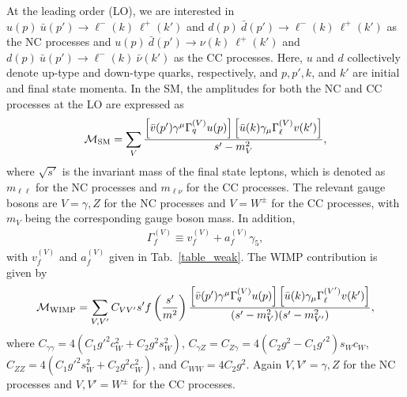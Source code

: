 \documentclass[12pt,twoside,book]{article}
\begin{document}
At the leading order (LO), we are interested in $u(p)~\bar{u}(p') \to \ell^{-}(k)~\ell^{+}(k')$ and $d(p)~\bar{d}(p') \to \ell^{-}(k)~\ell^{+}(k')$ as the NC processes and $u(p)~\bar{d}(p') \to \nu(k)~\ell^{+}(k')$ and $d(p)~\bar{u}(p') \to \ell^{-}(k)~\bar{\nu}(k')$ as the CC processes.
Here, $u$ and $d$ collectively denote up-type and down-type quarks, respectively, and $p, p', k$, and $k'$ are initial and final state momenta.
In the SM, the amplitudes for both the NC and CC processes at the LO are expressed as
\begin{align}
 \mathcal{M}_{\rm SM} = \sum_{V} \frac{\left[ \bar{v}(p')
 \gamma^\mu \Gamma_q^{(V)} u(p) \right] \left[ \bar{u}(k) \gamma_\mu
 \Gamma_{\ell}^{(V)} v(k') \right]}{s' - m_V^2},\label{eq_m_sm}
\end{align}
where $\sqrt{s'}$ is the invariant mass of the final state leptons, which is denoted as $m_{\ell\ell}$ for the NC processes and $m_{\ell\nu}$ for the CC processes.
The relevant gauge bosons are $V = \gamma, Z$ for the NC processes and $V = W^\pm$ for the CC processes, with $m_V$ being the corresponding gauge boson mass.
In addition,
\begin{align}
  \Gamma_f^{(V)} \equiv v_f^{(V)} + a_f^{(V)} \gamma_5,
\end{align}
with $v_f^{(V)}$ and $a_f^{(V)}$ given in Tab.~\ref{table_weak}.
The WIMP contribution is given by
\begin{align}
 \mathcal{M}_{\rm WIMP} = \sum_{V,V'} C_{VV'} s' f\left(\frac{s'}{m^2}\right)
 \frac{\left[ \bar{v}(p') \gamma^\mu \Gamma_q^{(V)} u(p) \right]
 \left[ \bar{u}(k) \gamma_\mu \Gamma_\ell^{(V')} v(k') \right]}
 {(s'-m_V^2)(s'-m_{V'}^2)},\label{eq_m_WIMP}
\end{align}
where $C_{\gamma \gamma} = 4(C_1 g'^2 c_W^2 + C_2 g^2 s_W^2)$, $C_{\gamma Z} = C_{Z \gamma} = 4(C_2 g^2 - C_1 g'^2) s_W c_W$, $C_{Z Z} = 4(C_1 g'^2 s_W^2 + C_2 g^2 c_W^2)$, and $C_{WW} = 4 C_2 g^2$.
Again $V, V' = \gamma, Z$ for the NC processes and $V, V' = W^\pm$ for the CC processes.
\end{document}
